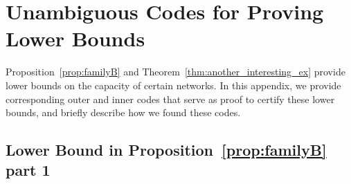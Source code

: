 \documentclass[11pt,a4paper]{article}
\theoremstyle{definition}
\begin{document}
\section{Unambiguous Codes for Proving Lower Bounds}
\label{sec:concretecodes}

Proposition~\ref{prop:familyB} and Theorem~\ref{thm:another_interesting_ex} provide lower bounds on the capacity of certain networks.
In this appendix, we provide corresponding outer and inner codes that serve as proof to certify these lower bounds, and briefly describe how we found these codes.


\subsection{Lower Bound in Proposition~\ref{prop:familyB} part 1}
\end{document}
